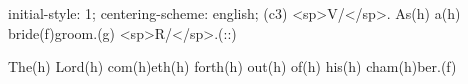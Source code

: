 initial-style: 1;
centering-scheme: english;
(c3) <sp>V/</sp>. As(h) a(h) bride(f)groom.(g) <sp>R/</sp>.(::)

The(h) Lord(h) com(h)eth(h) forth(h) out(h) of(h) his(h) cham(h)ber.(f)
